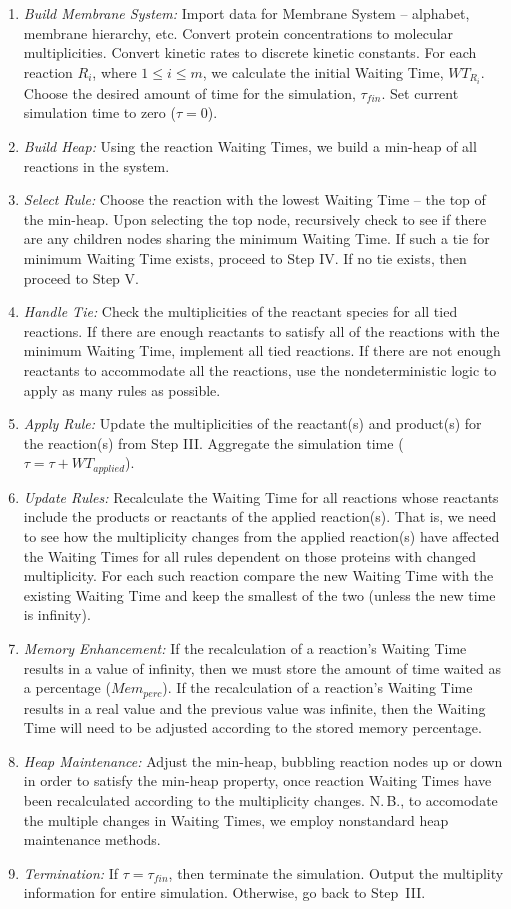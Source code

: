 \documentclass[copyright]{eptcs}
\newcommand{\wtri}{$WT_{R_i}$}
\begin{document}
\begin{enumerate}[{\sc(i)}]
\item  {\it Build Membrane System:} Import data for Membrane System -- alphabet, membrane 
hierarchy, etc.  Convert protein concentrations to molecular multiplicities.  Convert 
kinetic rates to discrete kinetic constants.  For each reaction $R_i$, where 
$1\leq i\leq m$, we calculate the initial Waiting Time, \wtri  .  
Choose the desired amount of time for the simulation, $\tau_{fin}$.  Set current simulation
time to zero ($\tau = 0$).
\item {\it Build Heap:}  Using the reaction Waiting Times, we build a min-heap of all 
reactions in the system.
\item  {\it Select Rule:} Choose the reaction with the lowest Waiting Time -- the top of the 
min-heap.  Upon selecting the top node, recursively check to see if there are any children 
nodes sharing the minimum Waiting Time.  If such a tie for minimum Waiting Time exists, 
proceed to Step IV.  If no tie exists, then proceed to Step V.
\item  {\it Handle Tie:} Check the multiplicities of the reactant species for all tied 
reactions.  If there are enough reactants to satisfy all of the reactions with the minimum 
Waiting Time, implement all tied reactions.  If there are not enough reactants to accommodate 
all the reactions, use the nondeterministic logic to apply as many rules as possible.
\item  {\it Apply Rule:} Update the multiplicities of the reactant(s) and product(s) for the 
reaction(s) from Step III.
Aggregate the simulation time (\hbox{$\tau = \tau + WT_{applied}$}).
\item  {\it Update Rules:} Recalculate the Waiting Time for all reactions whose reactants 
include the products or reactants of the applied reaction(s).  That is, we need to see how 
the multiplicity changes from the applied reaction(s) have affected the Waiting Times for 
all rules dependent on those proteins with changed multiplicity.  For each such reaction 
compare the new Waiting Time with the existing Waiting Time and keep the smallest of the
two (unless the new time is infinity).
\item {\it Memory Enhancement:} If the recalculation of a reaction's Waiting Time results 
in a value of infinity, then we must store the amount of time waited as a percentage 
($\mathit{Mem}_{\mathit{perc}}$).  If the recalculation of a reaction's Waiting Time 
results in a real value and the previous value was infinite, then the Waiting Time will
need to be adjusted according to the stored memory percentage.
\item  {\it Heap Maintenance:} Adjust the min-heap, bubbling reaction nodes up or down in 
order to satisfy the min-heap property, once reaction Waiting Times have been recalculated
according to the multiplicity changes.  N.\,B., to accomodate the multiple changes in 
Waiting Times, we employ nonstandard heap maintenance methods.
\item  {\it Termination:} If $\tau = \tau_{fin}$, then terminate the simulation.  
Output the multiplity information for entire simulation.  Otherwise, go back to Step~III.
\end{enumerate}
\end{document}

